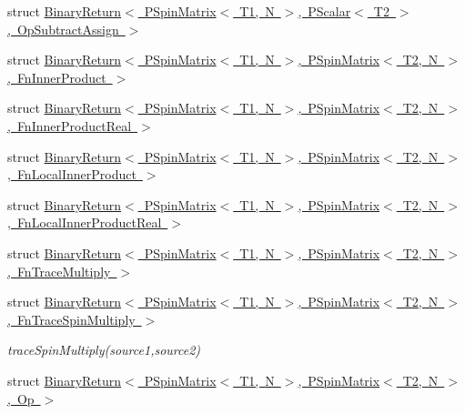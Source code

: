 \begin{DoxyCompactItemize}
\item 
struct \mbox{\hyperlink{structENSEM_1_1BinaryReturn_3_01PSpinMatrix_3_01T1_00_01N_01_4_00_01PScalar_3_01T2_01_4_00_01OpSubtractAssign_01_4}{Binary\+Return$<$ P\+Spin\+Matrix$<$ T1, N $>$, P\+Scalar$<$ T2 $>$, Op\+Subtract\+Assign $>$}}
\item 
struct \mbox{\hyperlink{structENSEM_1_1BinaryReturn_3_01PSpinMatrix_3_01T1_00_01N_01_4_00_01PSpinMatrix_3_01T2_00_01N_01_4_00_01FnInnerProduct_01_4}{Binary\+Return$<$ P\+Spin\+Matrix$<$ T1, N $>$, P\+Spin\+Matrix$<$ T2, N $>$, Fn\+Inner\+Product $>$}}
\item 
struct \mbox{\hyperlink{structENSEM_1_1BinaryReturn_3_01PSpinMatrix_3_01T1_00_01N_01_4_00_01PSpinMatrix_3_01T2_00_01N_01_4_00_01FnInnerProductReal_01_4}{Binary\+Return$<$ P\+Spin\+Matrix$<$ T1, N $>$, P\+Spin\+Matrix$<$ T2, N $>$, Fn\+Inner\+Product\+Real $>$}}
\item 
struct \mbox{\hyperlink{structENSEM_1_1BinaryReturn_3_01PSpinMatrix_3_01T1_00_01N_01_4_00_01PSpinMatrix_3_01T2_00_01N_01c4db3884b32cba02d837337f3b77f0f0}{Binary\+Return$<$ P\+Spin\+Matrix$<$ T1, N $>$, P\+Spin\+Matrix$<$ T2, N $>$, Fn\+Local\+Inner\+Product $>$}}
\item 
struct \mbox{\hyperlink{structENSEM_1_1BinaryReturn_3_01PSpinMatrix_3_01T1_00_01N_01_4_00_01PSpinMatrix_3_01T2_00_01N_01eaeba25a25a0a8754a5e4bd724d7056c}{Binary\+Return$<$ P\+Spin\+Matrix$<$ T1, N $>$, P\+Spin\+Matrix$<$ T2, N $>$, Fn\+Local\+Inner\+Product\+Real $>$}}
\item 
struct \mbox{\hyperlink{structENSEM_1_1BinaryReturn_3_01PSpinMatrix_3_01T1_00_01N_01_4_00_01PSpinMatrix_3_01T2_00_01N_01_4_00_01FnTraceMultiply_01_4}{Binary\+Return$<$ P\+Spin\+Matrix$<$ T1, N $>$, P\+Spin\+Matrix$<$ T2, N $>$, Fn\+Trace\+Multiply $>$}}
\item 
struct \mbox{\hyperlink{structENSEM_1_1BinaryReturn_3_01PSpinMatrix_3_01T1_00_01N_01_4_00_01PSpinMatrix_3_01T2_00_01N_01fe1ad0c4fbb2ea3b6d703682cfed6045}{Binary\+Return$<$ P\+Spin\+Matrix$<$ T1, N $>$, P\+Spin\+Matrix$<$ T2, N $>$, Fn\+Trace\+Spin\+Multiply $>$}}
\begin{DoxyCompactList}\small\item\em trace\+Spin\+Multiply(source1,source2) \end{DoxyCompactList}\item 
struct \mbox{\hyperlink{structENSEM_1_1BinaryReturn_3_01PSpinMatrix_3_01T1_00_01N_01_4_00_01PSpinMatrix_3_01T2_00_01N_01_4_00_01Op_01_4}{Binary\+Return$<$ P\+Spin\+Matrix$<$ T1, N $>$, P\+Spin\+Matrix$<$ T2, N $>$, Op $>$}}

\end{DoxyCompactItemize}
